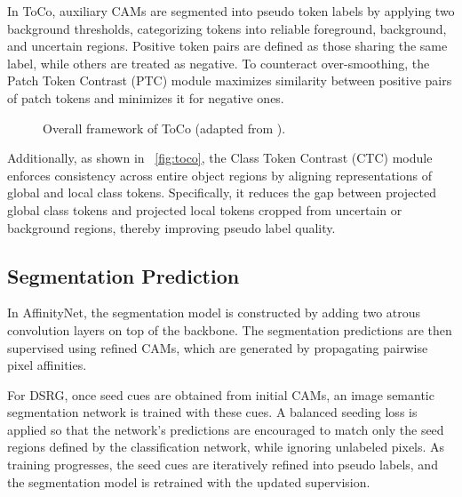 In ToCo\cite{wsss_toco_token_contrast}, auxiliary CAMs are segmented into pseudo token labels by applying two background thresholds, categorizing tokens into reliable foreground, background, and uncertain regions. Positive token pairs are defined as those sharing the same label, while others are treated as negative. To counteract over-smoothing, the Patch Token Contrast (PTC) module maximizes similarity between positive pairs of patch tokens and minimizes it for negative ones. 
\begin{figure}[htbp]
    \centering
    \caption{Overall framework of ToCo (adapted from \cite{wsss_toco_token_contrast}).}
    \label{fig:toco}
\end{figure}
Additionally, as shown in ~\autoref{fig:toco}, the Class Token Contrast (CTC) module enforces consistency across entire object regions by aligning representations of global and local class tokens. Specifically, it reduces the gap between projected global class tokens and projected local tokens cropped from uncertain or background regions, thereby improving pseudo label quality.

\subsection{Segmentation Prediction}
\label{subsec:segmentation-prediction}
In AffinityNet\cite{wsss_affinitynet}, the segmentation model is constructed by adding two atrous convolution layers on top of the backbone. The segmentation predictions are then supervised using refined CAMs, which are generated by propagating pairwise pixel affinities.

For DSRG\cite{wsss_dsrg_deep_seeded_region_growing}, once seed cues are obtained from initial CAMs, an image semantic segmentation network is trained with these cues. A balanced seeding loss is applied so that the network's predictions are encouraged to match only the seed regions defined by the classification network, while ignoring unlabeled pixels. As training progresses, the seed cues are iteratively refined into pseudo labels, and the segmentation model is retrained with the updated supervision.

